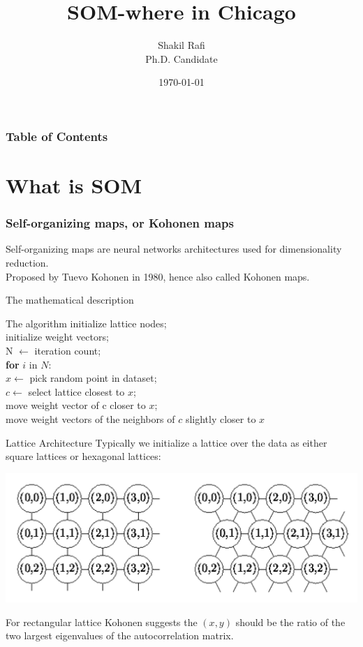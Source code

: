 \documentclass{beamer}
\title{SOM-where in Chicago}
\author{Shakil Rafi \\ Ph.D. Candidate}
\institute[University of Arkansas] 
{
University of Arkansas \\ 
\medskip
}
\date{\today}
\begin{document}
\nocite{*}
\begin{frame}
\titlepage 
\end{frame}

\begin{frame}
\frametitle{Table of Contents} 
    \tableofcontents 
\end{frame}


\section{What is SOM}
\begin{frame}
\frametitle{Self-organizing maps, or Kohonen maps}
Self-organizing maps are neural networks architectures used for dimensionality reduction. \\
Proposed by Tuevo Kohonen in 1980, hence also called Kohonen maps.
\\
\end{frame}
\begin{frame}{The mathematical description}
	\begin{block}{The algorithm}
	initialize lattice nodes;\\
	initialize weight vectors; \\
	N $\leftarrow$ iteration count; \\
	\textbf{for} $i$ in $N$:	\\
	\quad	$x \leftarrow$ pick random point in dataset; \\
	\quad 	$c \leftarrow$ select lattice closest to $x$;\\
	\quad 	move weight vector of c closer to $x$;\\
	\quad 	move weight vectors of the neighbors of $c$ slightly closer to $x$
	\end{block}

\end{frame}
\begin{frame}{Lattice Architecture}
	Typically we initialize a lattice over the data as either square lattices or hexagonal lattices:
	\begin{center}
	\includegraphics[scale=0.3]{lattice-structure}
	\end{center}
	For rectangular lattice Kohonen suggests the $(x,y)$ should be the ratio of the two largest eigenvalues of the autocorrelation matrix.
\end{frame}
\end{document}
